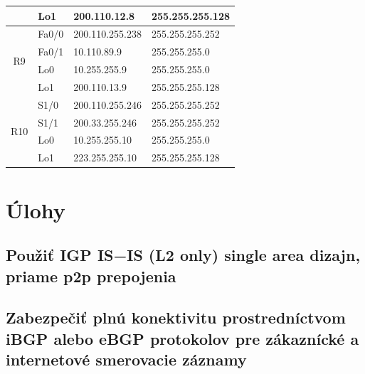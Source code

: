 \documentclass[12pt,twoside,a4paper]{report}
\begin{document}
\begin{table}[!htbp]
\begin{tabular}{|c|l|l|l|}
                     & Lo1                                     & 200.110.12.8                            & 255.255.255.128                     \\ \hline
\multirow{4}{*}{R9}  & Fa0/0                                   & 200.110.255.238                         & 255.255.255.252                     \\ \cline{2-4} 
                     & Fa0/1                                   & 10.110.89.9                             & 255.255.255.0                       \\ \cline{2-4} 
                     & Lo0                                     & 10.255.255.9                            & 255.255.255.0                       \\ \cline{2-4} 
                     & Lo1                                     & 200.110.13.9                            & 255.255.255.128                     \\ \hline
\multirow{4}{*}{R10} & S1/0                                    & 200.110.255.246                         & 255.255.255.252                     \\ \cline{2-4} 
                     & S1/1                                    & 200.33.255.246                          & 255.255.255.252                     \\ \cline{2-4} 
                     & Lo0                                     & 10.255.255.10                           & 255.255.255.0                       \\ \cline{2-4} 
                     & Lo1                                     & 223.255.255.10                          & 255.255.255.128                     \\ \hline
\end{tabular}
\end{table}



\newpage

\section{Úlohy}
\subsection{Použiť IGP IS−IS (L2 only) single area dizajn, priame p2p prepojenia}
\subsection{Zabezpečiť plnú konektivitu prostredníctvom iBGP alebo eBGP protokolov pre zákaznícké a internetové smerovacie záznamy}
\end{document}
